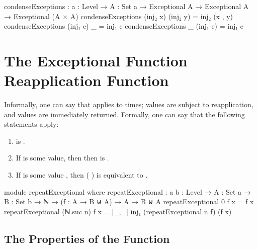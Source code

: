\documentclass{report}
\begin{document}
\begin{code}
condenseExceptions : {a : Level} →
                     {A : Set a} →
                     Exceptional A →
                     Exceptional A →
                     Exceptional (A × A)
condenseExceptions (inj₂ x) (inj₂ y) = inj₂ (x , y)
condenseExceptions (inj₁ e) _ = inj₁ e
condenseExceptions _ (inj₁ e) = inj₁ e
\end{code}

\section{The Exceptional Function Reapplication Function}
Informally, one can say that     applies  to   times;  values are subject to reapplication, and  values are immediately returned.  Formally, one can say that the following statements apply:

\begin{enumerate}
  \item {}    is  .\label{enum:repeatExceptional-zeroIsBasicApplication}
  \item If   is some  value, then then     is  .\label{enum:repeatExceptional-inj1GetsReturned}
  \item If   is some value  , then  \AgdaSymbol( \AgdaSymbol)   is equivalent to    .\label{enum:inj2GetsRepeat}
\end{enumerate}

\begin{code}
module repeatExceptional where
  repeatExceptional :
    {a b : Level} →
    {A : Set a} →
    {B : Set b} →
    ℕ → (f : A → B ⊎ A) → A → B ⊎ A
  repeatExceptional 0 f x = f x
  repeatExceptional (ℕ.suc n) f x =
    [_,_] inj₁ (repeatExceptional n f) (f x)
\end{code}

\subsection{The Properties of the Function}
\end{document}
